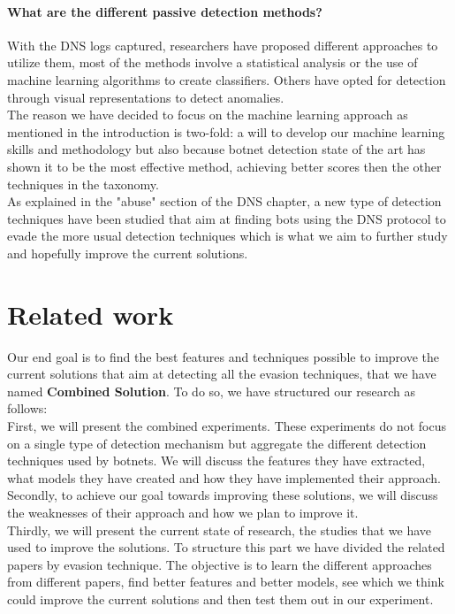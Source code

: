 \paragraph{What are the different passive detection methods?}
With the DNS logs captured, researchers have proposed different approaches to utilize them, most of the methods involve a statistical analysis or the use of machine learning algorithms to create classifiers. Others have opted for detection through visual representations to detect anomalies.\\
The reason we have decided to focus on the machine learning approach as mentioned in the introduction is two-fold: a will to develop our machine learning skills and methodology but also because botnet detection state of the art has shown it to be the most effective method, achieving better scores then the other techniques in the taxonomy.\\
As explained in the "abuse" section of the DNS chapter, a new type of detection techniques have been studied that aim at finding bots using the DNS protocol to evade the more usual detection techniques which is what we aim to further study and hopefully improve the current solutions.

\section{Related work}
Our end goal is to find the best features and techniques possible to improve the current solutions that aim at detecting all the evasion techniques, that we have named \textbf{Combined Solution}. To do so, we have structured our research as follows:\\
First, we will present the combined experiments. These experiments do not focus on a single type of detection mechanism but aggregate the different detection techniques used by botnets. We will discuss the features they have extracted, what models they have created and how they have implemented their approach.\\
Secondly, to achieve our goal towards improving these solutions, we will discuss the weaknesses of their approach and how we plan to improve it.\\
Thirdly, we will present the current state of research, the studies that we have used to improve the solutions. To structure this part we have divided the related papers by evasion technique.
The objective is to learn the different approaches from different papers, find better features and better models, see which we think could improve the current solutions and then test them out in our experiment.

